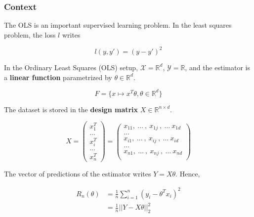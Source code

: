 \documentclass[
10pt, %
a4paper, %
oneside, %
headinclude,footinclude, %
BCOR5mm, %
]{scrartcl}
\begin{document}
\subsubsection{\large\color{Periwinkle}Context}
\label{con:ols}

The OLS is an important supervised learning problem. In the least squares problem, the loss $l$ writes 

\begin{equation*}
    l(y,y') = (y-y')^2
\end{equation*}

In the Ordinary Least Squares (OLS) setup, $ \mathcal{X} = \mathbb{R}^d$, $ \mathcal{Y}  = \mathbb{R} $, and the estimator is a \textbf{{linear function}} parametrized by $ \theta\in \mathbb{R}^d$.

\begin{equation*}
    F = \{ x\mapsto x^T \theta, \theta \in \mathbb{R}^d\}
\end{equation*}

The dataset is stored in the \textbf{{design matrix}} $X\in \mathbb{R}^{n\times d}$.

\begin{equation*}
X=
\begin{pmatrix}
x_{1}^T\\
...\\
x_{i}^T\\
...\\
x_{n}^T
\end{pmatrix}
=
\begin{pmatrix}
    x_{11}, \:\dots\:,\: x_{1j}\:, \:\dots\: x_{1d}\\
...\\
    x_{i1}, \:\dots\:,\: x_{ij}\:, \:\dots\: x_{id}\\
...\\
    x_{n1}, \:\dots\:,\: x_{nj}\:, \:\dots\: x_{nd}\\
\end{pmatrix}
\end{equation*}

The vector of predictions of the estimator writes $Y = X\theta$.  Hence,

\begin{equation*}
    \begin{aligned}
	R_n(\theta) &= \frac{1}{n} \sum^{n}_{i=1} (y_i-\theta^Tx_i)^2\\
	&= \frac{1}{n} ||Y-X\theta||_2^2
    \end{aligned}
\end{equation*}
\end{document}
